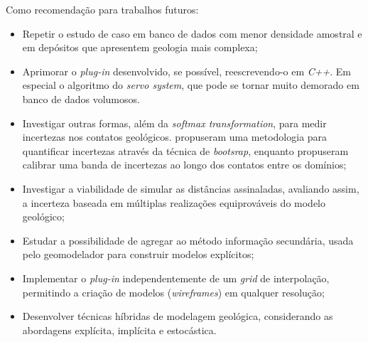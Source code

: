 Como recomendação para trabalhos futuros:

\begin{itemize}
\item Repetir o estudo de caso em banco de dados com menor densidade amostral e em depósitos que apresentem geologia mais complexa;
\item Aprimorar o \textit{plug-in} desenvolvido, se possível, reescrevendo-o em \textit{C++}. Em especial o algoritmo do \textit{servo system}, que pode se tornar muito demorado em banco de dados volumosos. 
\item Investigar outras formas, além da \textit{softmax transformation}, para medir incertezas nos contatos geológicos.  propuseram uma metodologia para quantificar incertezas através da técnica de \textit{bootsrap}, enquanto  propuseram calibrar uma banda de incertezas ao longo dos contatos entre os domínios;
\item Investigar a viabilidade de simular as distâncias assinaladas, avaliando assim, a incerteza baseada em múltiplas realizações equiprováveis do modelo geológico;
\item Estudar a possibilidade de agregar ao método informação secundária, usada pelo geomodelador para construir modelos explícitos;
\item Implementar o \textit{plug-in} independentemente de um \textit{grid} de interpolação, permitindo a criação de modelos (\textit{wireframes}) em qualquer resolução;
\item Desenvolver técnicas híbridas de modelagem geológica, considerando as abordagens explícita, implícita e estocástica.
\end{itemize}